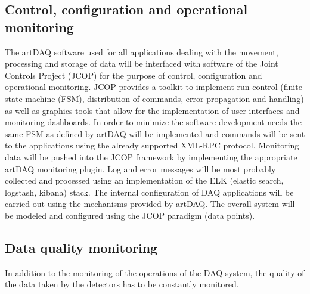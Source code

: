 \subsection{Control, configuration and operational monitoring}
The artDAQ software used for all applications dealing with the movement,
processing and storage of data will be interfaced with software of the
Joint Controls Project (JCOP) for the purpose of control, configuration
and operational monitoring.  JCOP provides a toolkit to implement run
control (finite state machine (FSM), distribution of commands, error
propagation and handling) as well as graphics tools that allow for the
implementation of user interfaces and monitoring dashboards.  In order to
minimize the software development needs the same FSM as defined by artDAQ
will be implemented and commands will be sent to the applications using
the already supported XML-RPC protocol.  Monitoring data will be pushed
into the JCOP framework by implementing the appropriate artDAQ monitoring
plugin.  Log and error messages will be most probably collected and
processed using an implementation of the ELK (elastic search, logstash,
kibana) stack.  The internal configuration of DAQ applications will be
carried out using the mechanisms provided by artDAQ. The overall system
will be modeled and configured using the JCOP paradigm (data points).



\subsection{Data quality monitoring}
In addition to the monitoring of the operations of the DAQ system, the
quality of the data taken by the detectors has to be constantly monitored.


